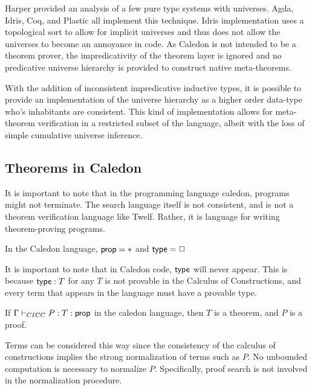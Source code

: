 Harper \citep{harper1991type} provided an analysis of a few pure type systems with universes.
Agda, Idris, Coq,
and Plastic \citep{callaghan2001implementation} all implement this technique.
Idris implementation uses a topological sort to allow for implicit universes
and thus does not allow the universes to become an annoyance in code. 
As Caledon is not intended to be a theorem prover, the impredicativity of the theorem layer is ignored and no 
predicative universe hierarchy is provided to construct native meta-theorems.

With the addition of inconsistent impredicative inductive types, it is possible to provide an implementation 
of the universe hierarchy as a higher order data-type who's inhabitants are consistent.  This kind of implementation 
allows for meta-theorem verification in a restricted subset of the language, albeit with the loss of 
simple cumulative universe inference.



\subsection{Theorems in Caledon}

It is important to note that in the programming language caledon, programs might not terminate.  
The search language itself is not consistent, and is not a theorem verification language like Twelf.  
Rather, it is language for writing theorem-proving programs.  

\begin{definition}
In the Caledon language, $\mathsf{prop} = *$ and $\mathsf{type} = \Box$
\end{definition}

It is important to note that in Caledon code, $\mathsf{type}$ will never appear.  This is because $\mathsf{type} : T$ for any $T$
is not provable in the Calculus of Constructions, and every term that appears in the language must have a provable type.

\begin{definition}
If $\Gamma \vdash_{CICC} P : T : \mathsf{prop}$ in the caledon language, then $T$ is a theorem, and $P$ is a proof.
\end{definition}

Terms can be considered this way since the consistency of the calculus of constructions implies the strong normalization
of terms such as $P$.  No unbounded computation is necessary to normalize $P$.  
Specifically, proof search is not involved in the normalization procedure.

